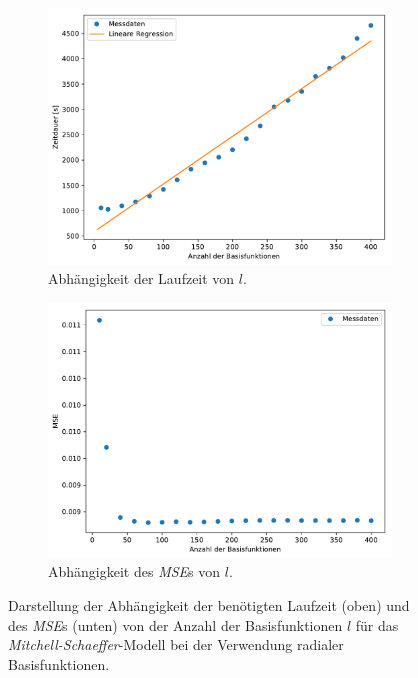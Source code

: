 \begin{appendices}
\begin{figure}[h]
	\centering
	\begin{subfigure}{\textwidth}
		\centering
		\includegraphics[width=4.8in]{figures/results/cross_prediction/rbf_placements_vh_time.pdf}
		\caption{Abhängigkeit der Laufzeit von $l$.}
	\end{subfigure}
	\begin{subfigure}{\textwidth}
		\centering
		\includegraphics[width=4.8in]{figures/results/cross_prediction/rbf_placements_vh_mse.pdf}
  		\caption{Abhängigkeit des \textit{MSE}s von $l$.}
	\end{subfigure}
	\caption{Darstellung der Abhängigkeit der benötigten Laufzeit (oben) und des \textit{MSE}s (unten) von der Anzahl der Basisfunktionen $l$ für das \textit{Mitchell-Schaeffer}-Modell bei der Verwendung radialer Basisfunktionen.}
	\label{fig:apx_exp_cross_rbf_placements_time_mse_ms}
\end{figure}


\end{appendices}
